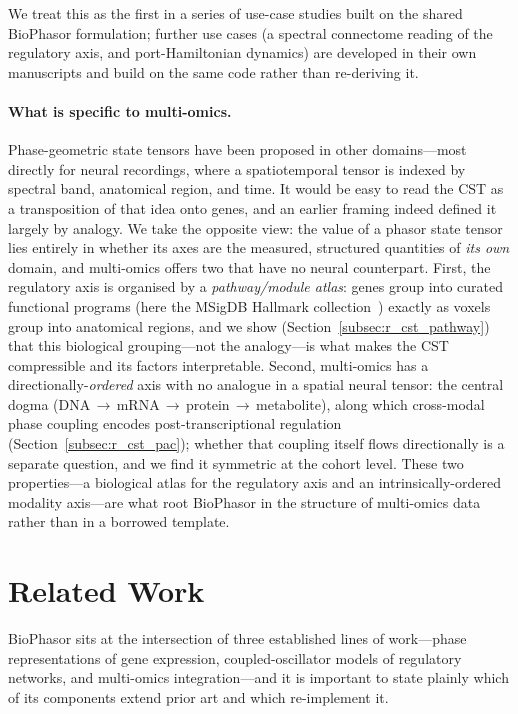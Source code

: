 \documentclass[preprint,12pt,amsmath,amssymb,superscriptaddress,floatfix]{revtex4-2}
\begin{document}
We treat this as the first in a series of use-case studies built on the shared
BioPhasor formulation; further use cases (a spectral connectome reading of the
regulatory axis, and port-Hamiltonian dynamics) are developed in their own
manuscripts and build on the same code rather than re-deriving it.

\paragraph{What is specific to multi-omics.}
Phase-geometric state tensors have been proposed in other domains---most
directly for neural recordings, where a spatiotemporal tensor is indexed by
spectral band, anatomical region, and time. It would be easy to read the CST as
a transposition of that idea onto genes, and an earlier framing indeed defined
it largely by analogy. We take the opposite view: the value of a phasor state
tensor lies entirely in whether its axes are the measured, structured
quantities of \emph{its own} domain, and multi-omics offers two that have no
neural counterpart. First, the regulatory axis is organised by a
\emph{pathway/module atlas}: genes group into curated functional programs
(here the MSigDB Hallmark collection~\cite{ref_liberzon_hallmark}) exactly as
voxels group into anatomical regions, and we show
(Section~\ref{subsec:r_cst_pathway}) that this biological grouping---not the
analogy---is what makes the CST compressible and its factors interpretable.
Second, multi-omics has a directionally-\emph{ordered} axis with no analogue in
a spatial neural tensor: the central dogma
(DNA\,$\rightarrow$\,mRNA\,$\rightarrow$\,protein\,$\rightarrow$\,metabolite),
along which cross-modal phase coupling encodes post-transcriptional regulation
(Section~\ref{subsec:r_cst_pac}); whether that coupling itself flows
directionally is a separate question, and we find it symmetric at the cohort
level. These two properties---a biological atlas for the regulatory axis and an
intrinsically-ordered modality axis---are what root BioPhasor in the structure
of multi-omics data rather than in a borrowed template.

\section{Related Work}
\label{sec:related_work}

BioPhasor sits at the intersection of three established lines of work---phase
representations of gene expression, coupled-oscillator models of regulatory
networks, and multi-omics integration---and it is important to state plainly
which of its components extend prior art and which re-implement it.
\end{document}
